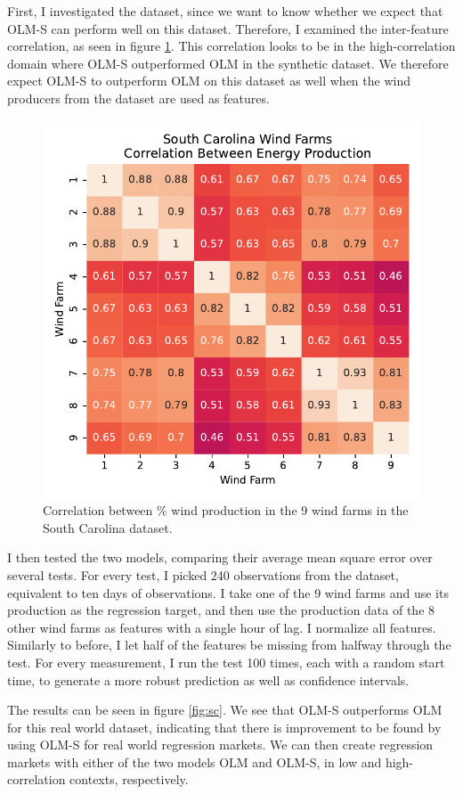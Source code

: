 First, I investigated the dataset, since we want to know whether we expect that
OLM-S can perform well on this dataset. Therefore, I examined the inter-feature
correlation, as seen in figure \ref{fig:sc_corr}. This correlation looks to be in
the high-correlation domain where OLM-S outperformed OLM in the synthetic
dataset. We therefore expect OLM-S to outperform OLM on this dataset as well
when the wind producers from the dataset are used as features.

\begin{figure}
  \centering
  \includegraphics[width=.7\linewidth]{Pictures/south_carolina_corr.pdf}
  \caption{Correlation between $\%$ wind production in the 9 wind farms in the South Carolina dataset.}
  \label{fig:sc_corr}
\end{figure}

I then tested the two models, comparing their average mean square error over
several tests. For every test, I picked 240 observations from the dataset,
equivalent to ten days of observations. I take one of the 9 wind farms and use
its production as the regression target, and then use the production data of
the 8 other wind farms as features with a single hour of lag. I normalize all
features. Similarly to before, I let half of the features be missing from halfway
through the test. For every measurement, I run the test 100 times, each with
a random start time, to generate a more robust prediction as well as
confidence intervals.

The results can be seen in figure \ref{fig:sc}. We see that OLM-S outperforms
OLM for this real world dataset, indicating that there is improvement to be
found by using OLM-S for real world regression markets. We can then create
regression markets with either of the two models OLM and OLM-S, in low and
high-correlation contexts, respectively.

